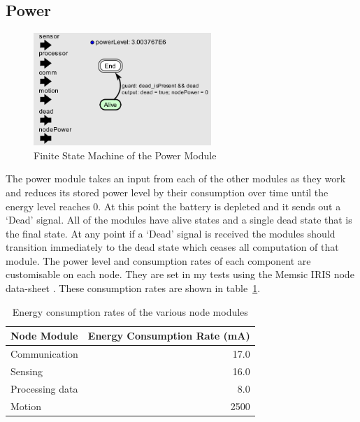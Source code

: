 \documentclass[authoryearcitations]{UoYCSproject}
\begin{document}
\subsection{Power}

\begin{figure}
 \centering
    \includegraphics[width=0.6\textwidth]{figures/power_Controller.png}
    \caption{Finite State Machine of the Power Module}
    \label{fig:powerControl}
\end{figure}

The power module takes an input from each of the other modules as they work and reduces its stored power level by their consumption over time until the energy level reaches 0. At this point the battery is depleted and it sends out a `Dead' signal. All of the modules have alive states and a single dead state that is the final state. At any point if a `Dead' signal is received the modules should transition immediately to the dead state which ceases all computation of that module. The power level and consumption rates of each component are customisable on each node. They are set in my tests using the Memsic IRIS node data-sheet \citep{Memsic2011}. These consumption rates are shown in table~\ref{tab:powerRates}.

\begin{table}[]
\centering
\begin{tabular}{@{}lr@{}}
\toprule
Node Module     & Energy Consumption Rate (mA) \\ \midrule
Communication   & 17.0                         \\
Sensing         & 16.0                         \\
Processing data & 8.0                          \\
Motion          & 2500                         \\ \bottomrule
\end{tabular}
\caption{Energy consumption rates of the various node modules}
\label{tab:powerRates}
\end{table}
\end{document}
